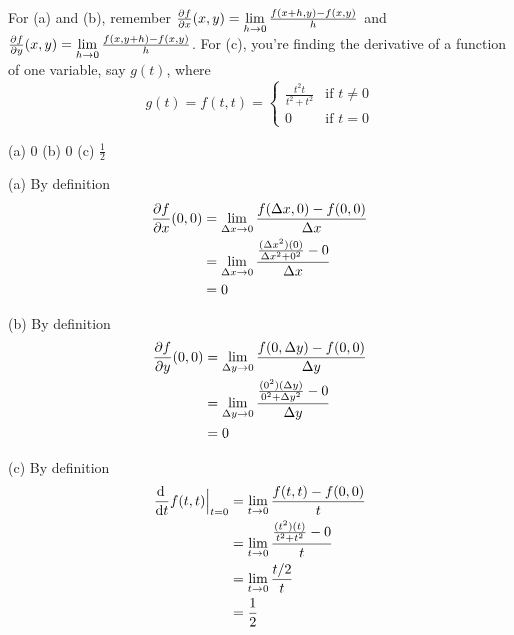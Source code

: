 \begin{hint}
For (a) and (b), remember $\pdiff{f}{x}(x,y)=\lim\limits_{h\to0}\frac{f(x+h,y)-f(x,y)}{h}$ and
$\pdiff{f}{y}(x,y)=\lim\limits_{h\to0}\frac{f(x,y+h)-f(x,y)}{h}$. For (c), you're finding the derivative of a function of one variable, say $g(t)$, where \begin{equation*}
g(t)=f(t,t)=\begin{cases}
                  \frac{t^2t}{t^2+t^2} & \text{if $t\ne 0$} \\
                  0                    & \text{if $t= 0$}
                 \end{cases}
\end{equation*}
\end{hint}

\begin{answer}
(a) $0$\qquad
(b) $0$\qquad
(c) $\frac{1}{2}$
\end{answer}

\begin{solution}
(a) By definition
\begin{align*}
\pdiff{f}{x}(0,0)
&=\lim_{\De x\rightarrow 0}\frac{f(\De x,0)-f(0,0)}{\De x} \\
&=\lim_{\De x\rightarrow 0}\frac{\frac{(\De x^2)(0)}{\De x^2+0^2}-0}{\De x} \\
&=0
\end{align*}

(b) By definition
\begin{align*}
\pdiff{f}{y}(0,0)
&=\lim_{\De y\rightarrow 0}\frac{f(0,\De y)-f(0,0)}{\De y} \\
&=\lim_{\De y\rightarrow 0}\frac{\frac{(0^2)(\De y)}{0^2+\De y^2}-0}{\De y} \\
&=0
\end{align*}

(c) By definition
\begin{align*}
\diff{}{t} f(t,t)\Big|_{t=0}
&=\lim_{t\rightarrow 0}\frac{f(t,t)-f(0,0)}{t} \\
&=\lim_{t\rightarrow 0}\frac{\frac{(t^2)(t)}{t^2+t^2}-0}{t} \\
&=\lim_{t\rightarrow 0}\frac{t/2}{t} \\
&=\frac{1}{2}
\end{align*}

\end{solution}



\subsection*{\Procedural}


